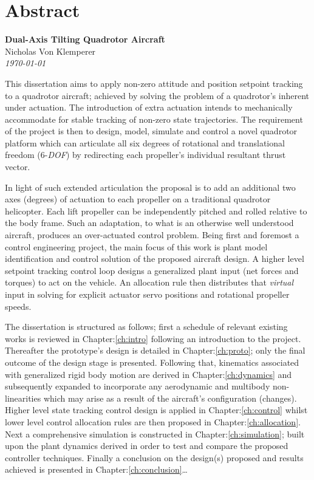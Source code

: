 \documentclass[a4paper, 11pt, oneside, openright, parskip=full]{book}
\newcommand{\auth}{Nicholas Von Klemperer}								%
\newcommand{\titl}{Dual-Axis Tilting Quadrotor Aircraft}						%
\begin{document}
\chapter{Abstract}				
\label{ch:abs}
\begin{center}
	\textbf{\Large \titl}\\
			\vskip 0.2cm
			\auth\\
			\vskip 0.2cm
	\textit{\footnotesize\today}
			\vskip 1cm
\end{center}
This dissertation aims to apply non-zero attitude and position setpoint tracking to a quadrotor aircraft; achieved by solving the problem of a quadrotor's inherent under actuation. The introduction of extra actuation intends to mechanically accommodate for stable tracking of non-zero state trajectories. The requirement of the project is then to design, model, simulate and control a novel quadrotor platform which can articulate all six degrees of rotational and translational freedom (6-\emph{DOF}) by redirecting each propeller's individual resultant thrust vector. 
\par
In light of such extended articulation the proposal is to add an additional two axes (degrees) of actuation to each propeller on a traditional quadrotor helicopter. Each lift propeller can be independently pitched and rolled relative to the body frame. Such an adaptation, to what is an otherwise well understood aircraft, produces an over-actuated control problem. Being first and foremost a control engineering project, the main focus of this work is plant model identification and control solution of the proposed aircraft design. A higher level setpoint tracking control loop designs a generalized plant input (net forces and torques) to act on the vehicle. An allocation rule then distributes that \emph{virtual} input in solving for explicit actuator servo positions and rotational propeller speeds.
\par
The dissertation is structured as follows; first a schedule of relevant existing works is reviewed in Chapter:\ref{ch:intro} following an introduction to the project. Thereafter the prototype's design is detailed in Chapter:\ref{ch:proto}; only the final outcome of the design stage is presented. Following that, kinematics associated with generalized rigid body motion are derived in Chapter:\ref{ch:dynamics} and subsequently expanded to incorporate any aerodynamic and multibody non-linearities which may arise as a result of the aircraft's configuration (changes). Higher level state tracking control design is applied in Chapter:\ref{ch:control} whilst lower level control allocation rules are then proposed in Chapter:\ref{ch:allocation}. Next a comprehensive simulation is constructed in Chapter:\ref{ch:simulation}; built upon the plant dynamics derived in order to test and compare the proposed controller techniques. Finally a conclusion on the design(s) proposed and results achieved is presented in Chapter:\ref{ch:conclusion}\ldots
\end{document}
